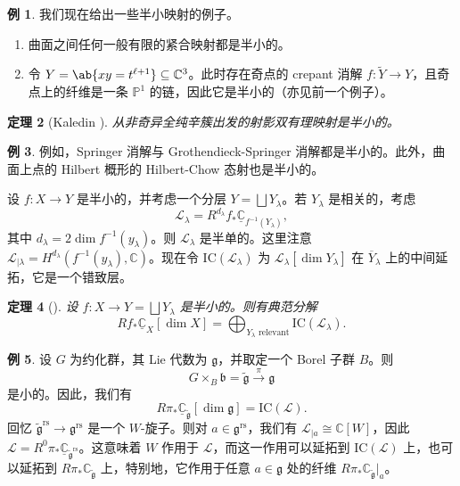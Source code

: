\documentclass{amsart}
\newtheorem{thm}{定理}[section]
\theoremstyle{definition}
\newtheorem{exm}[thm]{例}
\newtheorem{exms}[thm]{例}
\theoremstyle{remark}
\theoremstyle{plain}
\theoremstyle{definition}
\theoremstyle{remark}
\newcommand{\C}{\mathbb{C}}
\renewcommand{\P}{\mathbb{P}}
\newcommand{\g}{\mathfrak{g}}
\renewcommand{\b}{\mathfrak{b}}
\newcommand{\mc}[1]{\mathcal{#1}}
\newcommand{\mr}[1]{\mathrm{#1}}
\newcommand{\on}[1]{\operatorname{#1}}
\newcommand{\ol}[1]{\overline{#1}}
\newcommand{\ul}[1]{\underline{#1}}
\newcommand{\1}{\mathbf{1}}
\newcommand{\2}{\mathbf{2}}
\newcommand{\3}{\mathbf{3}}
\begin{document}
\begin{exms}
    我们现在给出一些半小映射的例子。
    \begin{enumerate}
        \item 曲面之间任何一般有限的紧合映射都是半小的。
        \item 令 \(Y = \ab\{xy = t^{\ell+1}\} \subseteq \C^3\)。此时存在奇点的 crepant 消解 \(f \colon \tilde{Y} \to Y\)，且奇点上的纤维是一条 \(\P^1\) 的链，因此它是半小的（亦见前一个例子）。
    \end{enumerate}
\end{exms}

\begin{thm}[Kaledin {\cite{Kaledin2006}}]
    从非奇异全纯辛簇出发的射影双有理映射是半小的。
\end{thm}

\begin{exm}
    例如，Springer 消解与 Grothendieck-Springer 消解都是半小的。此外，曲面上点的 Hilbert 概形的 Hilbert-Chow 态射也是半小的。
\end{exm}

设 \(f \colon X \to Y\) 是半小的，并考虑一个分层 \(Y = \bigsqcup Y_{\lambda}\)。若 \(Y_{\lambda}\) 是相关的，考虑
\[ \mc{L}_{\lambda} = R^{d_{\lambda}} f_* \ul{\C}_{f^{-1}(Y_{\lambda})}, \]
其中 \(d_{\lambda} = 2 \dim f^{-1} (y_{\lambda})\)。则 \(\mc{L}_{\lambda}\) 是半单的。这里注意 \(\mc{L}_{|\lambda} = H^{d_{\lambda}}(f^{-1}(y_{\lambda}), \C)\)。现在令 \(\mr{IC}(\mc{L}_{\lambda})\) 为 \(\mc{L}_{\lambda}[\dim Y_{\lambda}]\) 在 \(\ol{Y}_{\lambda}\) 上的中间延拓，它是一个错致层。

\begin{thm}[{\cite{DeCataldoMigliorini2002}}]
    设 \(f \colon X \to Y = \bigsqcup Y_{\lambda}\) 是半小的。则有典范分解
    \[ R f_* \ul{\C}_X[\dim X] = \bigoplus_{Y_{\lambda}\text{ relevant}} \mr{IC}(\mc{L}_{\lambda}). \]
\end{thm}

\begin{exm}
    设 \(G\) 为约化群，其 Lie 代数为 \(\g\)，并取定一个 Borel 子群 \(B\)。则
    \[ G \times_B \b = \tilde{\g} \xrightarrow{\pi} \g \]
    是小的。因此，我们有
    \[ R \pi_* \ul{\C}_{\tilde{\g}} [\dim \g] = \mr{IC}(\mc{L}). \]
    回忆 \(\tilde{\g}^{\on{rs}} \to \g^{\on{rs}}\) 是一个 \(W\)-旋子。则对 \(a \in \g^{\on{rs}}\)，我们有 \(\mc{L}_{|a} \cong \C[W]\)，因此 \(\mc{L} = R^0 \pi_* \ul{\C}_{\tilde{\g}^{\on{rs}}}\)。这意味着 \(W\) 作用于 \(\mc{L}\)，而这一作用可以延拓到 \(\mr{IC}(\mc{L})\) 上，也可以延拓到 \(R \pi_* \C_{\tilde{\g}}\) 上，特别地，它作用于任意 \(a \in \g\) 处的纤维 \(R \pi_* \C_{\tilde{\g}}|_a\)。
\end{exm}
\end{document}
